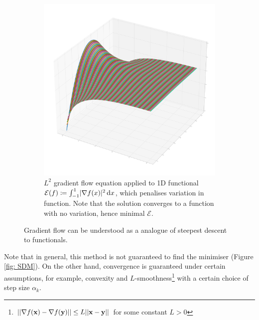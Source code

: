 \documentclass[../dissertation.tex]{subfiles}
\begin{document}
\begin{figure}[tbp]
\begin{subfigure}[b]{0.4\textwidth}
        \includegraphics[width=\textwidth]{sections/gradientFlowImgs/gf}
        \caption{$L^2$ gradient flow equation applied to 1D functional $\mathcal{E} (f) \coloneqq \int_{-1}^1 \lvert\nabla f(x)\lvert^2 \, \text{d} x$, which penalises variation in function. Note that the solution converges to a function with no variation, hence minimal $\mathcal{E}$.}
        \label{fig: GF}
    \end{subfigure}
    \caption{Gradient flow can be understood as a analogue of steepest descent to functionals.}
\end{figure}
Note that in general, this method is not guaranteed to find the minimiser (Figure \ref{fig: SDM}).
On the other hand, convergence is guaranteed under certain assumptions, for example, convexity and $L$-smoothness\footnote{$\lvert \lvert \nabla f(\mathbf{x}) - \nabla f(\mathbf{y}) \rvert \rvert \leq L \lvert \lvert \mathbf{x}-\mathbf{y} \rvert \rvert$ for some constant $L > 0$}
with a certain choice of step size $\alpha_k$.
\end{document}
